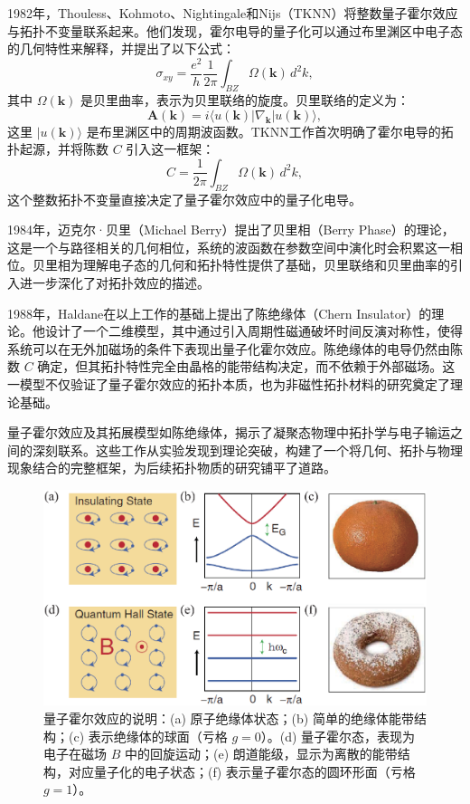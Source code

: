 1982年，Thouless、Kohmoto、Nightingale和Nijs（TKNN）将整数量子霍尔效应与拓扑不变量联系起来\cite{d3}。他们发现，霍尔电导的量子化可以通过布里渊区中电子态的几何特性来解释，并提出了以下公式：
\begin{equation} \label{eq1-3}
    \sigma_{xy} = \frac{e^2}{h} \frac{1}{2\pi} \int_{BZ} \Omega(\mathbf{k}) \, d^2k,
\end{equation}
其中 \( \Omega(\mathbf{k}) \) 是贝里曲率，表示为贝里联络的旋度。贝里联络的定义为：
\begin{equation} \label{eq1-4}
    \mathbf{A}(\mathbf{k}) = i \langle u(\mathbf{k}) | \nabla_{\mathbf{k}} | u(\mathbf{k}) \rangle,
\end{equation}
这里 \( |u(\mathbf{k})\rangle \) 是布里渊区中的周期波函数。TKNN工作首次明确了霍尔电导的拓扑起源，并将陈数 \( C \) 引入这一框架：
\begin{equation} \label{eq1-5}
    C = \frac{1}{2\pi} \int_{BZ} \Omega(\mathbf{k}) \, d^2k,
\end{equation}
这个整数拓扑不变量直接决定了量子霍尔效应中的量子化电导。

1984年，迈克尔·贝里（Michael Berry）提出了贝里相（Berry Phase）的理论\cite{d4}，这是一个与路径相关的几何相位，系统的波函数在参数空间中演化时会积累这一相位。贝里相为理解电子态的几何和拓扑特性提供了基础，贝里联络和贝里曲率的引入进一步深化了对拓扑效应的描述。

1988年，Haldane在以上工作的基础上提出了陈绝缘体（Chern Insulator）的理论\cite{d5}。他设计了一个二维模型，其中通过引入周期性磁通破坏时间反演对称性，使得系统可以在无外加磁场的条件下表现出量子化霍尔效应。陈绝缘体的电导仍然由陈数 \( C \) 确定，但其拓扑特性完全由晶格的能带结构决定，而不依赖于外部磁场。这一模型不仅验证了量子霍尔效应的拓扑本质，也为非磁性拓扑材料的研究奠定了理论基础。

量子霍尔效应及其拓展模型如陈绝缘体，揭示了凝聚态物理中拓扑学与电子输运之间的深刻联系。这些工作从实验发现到理论突破，构建了一个将几何、拓扑与物理现象结合的完整框架，为后续拓扑物质的研究铺平了道路。

\begin{figure}[h!]
    \centering
    \includegraphics[width=1\textwidth]{images/fig1-2.eps} 
    \caption{量子霍尔效应的说明：(a) 原子绝缘体状态；(b) 简单的绝缘体能带结构；(c) 表示绝缘体的球面（亏格 \( g=0 \)）。(d) 量子霍尔态，表现为电子在磁场 \( B \) 中的回旋运动；(e) 朗道能级，显示为离散的能带结构，对应量子化的电子状态；(f) 表示量子霍尔态的圆环形面（亏格 \( g=1 \)）。\cite{r11}}
    \label{fig_1_2}
\end{figure}


